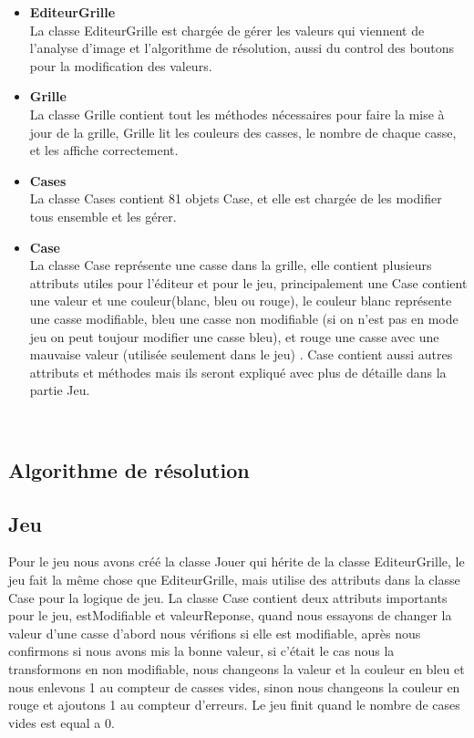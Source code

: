 \documentclass{article}
\begin{document}
\begin{itemize}
    \item \textbf{EditeurGrille} \\
La classe EditeurGrille est chargée de gérer les valeurs qui viennent de l’analyse d’image et l’algorithme de résolution, aussi du control des boutons pour la modification des valeurs. 

    \item \textbf{Grille} \\
La classe Grille contient tout les méthodes nécessaires pour faire la mise à jour de la grille, Grille lit les couleurs des casses, le nombre de chaque casse, et les affiche correctement.
    
    \item \textbf{Cases} \\
La classe Cases contient 81 objets Case, et elle est chargée de les modifier tous ensemble et les gérer. 
    
    \item \textbf{Case} \\
La classe Case représente une casse dans la grille, elle contient plusieurs attributs utiles pour l'éditeur et pour le jeu, principalement une Case contient une valeur et une couleur(blanc, bleu ou rouge), le couleur blanc représente une casse modifiable, bleu une casse non modifiable (si on n’est pas en mode jeu on peut toujour modifier une casse bleu), et rouge une casse avec une mauvaise valeur (utilisée seulement dans le jeu) . Case contient aussi autres attributs et méthodes mais ils seront expliqué avec plus de détaille dans la partie Jeu.


\end{itemize}\\


\subsection{Algorithme de résolution}
\subsection*{Jeu}
Pour le jeu nous avons créé la classe Jouer qui hérite de la classe EditeurGrille, le jeu fait la même chose que EditeurGrille, mais utilise des attributs dans la classe Case pour la logique de jeu. La classe Case contient deux attributs importants pour le jeu, estModifiable et valeurReponse,  quand nous essayons de changer la valeur d’une casse d’abord nous vérifions si elle est modifiable, après nous confirmons si nous avons mis la bonne valeur, si c'était le cas nous la transformons en non modifiable, nous changeons la valeur et la couleur en bleu et nous enlevons 1 au compteur de casses vides, sinon nous changeons la couleur en rouge et ajoutons 1 au compteur d’erreurs. Le jeu finit quand le nombre de cases vides est equal a 0.
\end{document}
